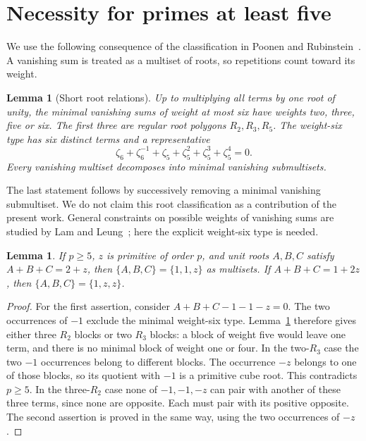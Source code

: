 \documentclass[11pt]{article}
\newtheorem{lemma}[theorem]{Lemma}
\theoremstyle{remark}\newtheorem{remark}[theorem]{Remark}
\begin{document}
\section{Necessity for primes at least five}
We use the following consequence of the classification in Poonen and Rubinstein~\cite[Section~3, Theorem~3 and Table~1]{PR}. A vanishing sum is treated as a multiset of roots, so repetitions count toward its weight.
\begin{lemma}[Short root relations]\label{roots}
Up to multiplying all terms by one root of unity, the minimal vanishing sums of weight at most six have weights two, three, five or six. The first three are regular root polygons $R_2,R_3,R_5$. The weight-six type has six distinct terms and a representative
\[
\zeta_6+\zeta_6^{-1}+\zeta_5+\zeta_5^2+\zeta_5^3+\zeta_5^4=0.
\]
Every vanishing multiset decomposes into minimal vanishing submultisets.
\end{lemma}
The last statement follows by successively removing a minimal vanishing submultiset. We do not claim this root classification as a contribution of the present work. General constraints on possible weights of vanishing sums are studied by Lam and Leung~\cite{LL}; here the explicit weight-six type is needed.

\begin{lemma}\label{forced}
If $p\geq5$, $z$ is primitive of order $p$, and unit roots $A,B,C$ satisfy $A+B+C=2+z$, then $\{A,B,C\}=\{1,1,z\}$ as multisets. If $A+B+C=1+2z$, then $\{A,B,C\}=\{1,z,z\}$.
\end{lemma}
\begin{proof}
For the first assertion, consider $A+B+C-1-1-z=0$. The two occurrences of $-1$ exclude the minimal weight-six type. Lemma~\ref{roots} therefore gives either three $R_2$ blocks or two $R_3$ blocks: a block of weight five would leave one term, and there is no minimal block of weight one or four. In the two-$R_3$ case the two $-1$ occurrences belong to different blocks. The occurrence $-z$ belongs to one of those blocks, so its quotient with $-1$ is a primitive cube root. This contradicts $p\geq5$. In the three-$R_2$ case none of $-1,-1,-z$ can pair with another of these three terms, since none are opposite. Each must pair with its positive opposite. The second assertion is proved in the same way, using the two occurrences of $-z$.
\end{proof}
\end{document}
